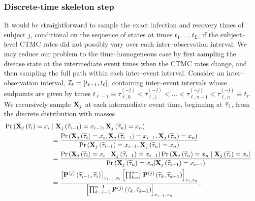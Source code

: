 \subsubsection{Discrete-time skeleton step}
It would be straightforward to sample the exact infection and recovery times of subject $ j $, conditional on the sequence of states at times $ t_1,\dots, t_L $, if the subject--level CTMC rates did not possibly vary over each inter--observation interval. We may reduce our problem to the time--homogeneous case by first sampling the disease state at the intermediate event times when the CTMC rates change, and then sampling the full path within each inter--event interval. Consider an inter--observation interval, $ \mathcal{I}_\ell = [t_{\ell-1}, t_\ell] $, containing inter--event intervals whose endpoints are given by times $ t_{\ell-1} \equiv \tau_{\ell,0}^{(-j)} < \tau_{\ell,1}^{(-j)}<\dots<\tau_{\ell,n-1}^{(-j)}  < \tau_{\ell,n}^{(-j)} \equiv t_\ell $. We recursively sample $ \mathbf{X}_j $ at each intermediate event time, beginning at $ \widetilde{\tau}_1 $, from the discrete distribution with masses 
\begin{align}
&\Pr\left (\mathbf{X}_j\left (\widetilde{\tau}_{i}\right ) = x_{i} \mid  \mathbf{X}_j\left (\widetilde{\tau}_{i-1}\right ) = x_{i-1}, \mathbf{X}_j\left (\widetilde{\tau}_{n}\right ) = x_n\right ) \nonumber \\  &\hspace{1in}= \frac{\Pr\left (\mathbf{X}_j\left (\widetilde{\tau}_{i}\right ) = x_{i}, \mathbf{X}_j\left (\widetilde{\tau}_{i-1}\right ) = x_{i-1}, \mathbf{X}_j\left (\widetilde{\tau}_{n}\right ) = x_n\right )}{\Pr\left (\mathbf{X}_j\left (\widetilde{\tau}_{i-1}\right ) = x_{i-1}, \mathbf{X}_j\left (\widetilde{\tau}_{n}\right ) = x_n\right )} \nonumber\\
&\hspace{1in}= \frac{\Pr\left (\mathbf{X}_j\left (\widetilde{\tau}_{i}\right ) = x_{i} \mid \mathbf{X}_j\left (\widetilde{\tau}_{i-1}\right ) = x_{i-1}\right )\Pr\left (\mathbf{X}_j\left (\widetilde{\tau}_{n}\right ) = x_n \mid \mathbf{X}_j\left (\widetilde{\tau}_{i}\right ) = x_{i}\right )}{\Pr\left (\mathbf{X}_j\left (\widetilde{\tau}_{n}\right ) = x_n | \mathbf{X}_j\left (\widetilde{\tau}_{i-1}\right ) = x_{i-1}\right)} \nonumber\\
&\hspace{1in} = \frac{\left [\mathbf{P}^{(j)}\left (\widetilde{\tau}_{i-1},\widetilde{\tau}_{i}\right )\right ]_{x_{i-1},x_{i}}\left [\prod_{k=i}^{n-1}\mathbf{P}^{(j)}\left (\widetilde{\tau}_{k}, \widetilde{\tau}_{k+1}\right )\right ]_{x_{i},x_n}}{\left [\prod_{k=i-1}^{n-1}\mathbf{P}^{(j)}\left (\widetilde{\tau}_{k}, \widetilde{\tau}_{k+1}\right )\right]_{x_{i-1},x_n}}.
\label{eqn:dt_skel}
\end{align}

